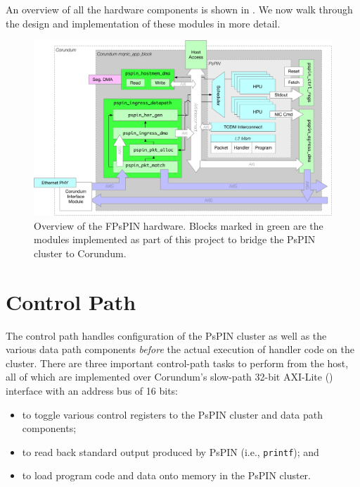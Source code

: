 An overview of all the hardware components is shown in .  We now walk through the design and implementation of these modules in more detail.

\begin{figure}
    \centering
    \includegraphics[width=\linewidth]{figures/hw-overview.pdf}
    \caption{Overview of the FPsPIN hardware.  Blocks marked in green are the modules implemented as part of this project to bridge the PsPIN cluster to Corundum.}
    \label{fig:hw-overview}
\end{figure}


\section{Control Path} \label{sec:hw-control}

The control path handles configuration of the PsPIN cluster as well as the various data path components \emph{before} the actual execution of handler code on the cluster.  There are three important control-path tasks to perform from the host, all of which are implemented over Corundum's slow-path 32-bit AXI-Lite () interface with an address bus of 16 bits:

\begin{itemize}
    \item to toggle various control registers to the PsPIN cluster and data path components;
    \item to read back standard output produced by PsPIN (i.e., \texttt{printf}); and
    \item to load program code and data onto memory in the PsPIN cluster.
\end{itemize}

